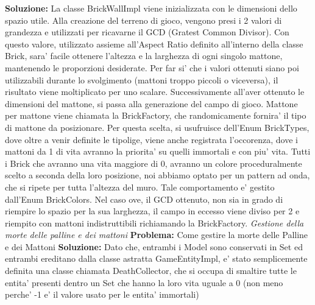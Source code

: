 \documentclass[a4paper,12pt]{report}
\begin{document}
\newline
\textbf{Soluzione:} La classe BrickWallImpl viene inizializzata con le dimensioni dello spazio utile.\newline
Alla creazione del terreno di gioco, vengono presi i 2 valori di grandezza e utilizzati per ricavarne il GCD (Gratest Common Divisor). Con questo valore, utilizzato assieme all'Aspect Ratio definito all'interno della classe Brick, sara' facile ottenere l'altezza e la larghezza di ogni singolo mattone, mantenendo le proporzioni desiderate.
Per far si' che i valori ottenuti siano poi utilizzabili durante lo svolgimento (mattoni troppo piccoli o viceversa), il risultato viene moltiplicato per uno scalare.\newline
Successivamente all'aver ottenuto le dimensioni del mattone, si passa alla generazione del campo di gioco. Mattone per mattone viene chiamata la BrickFactory, che randomicamente fornira' il tipo di mattone da posizionare. Per questa scelta, si usufruisce dell'Enum BrickTypes, dove oltre a venir  definite le tipolige, viene anche registrata l'occorenza, dove i mattoni da 1 di vita avranno la priorita' su quelli immortali e con piu' vita. \newline
Tutti i Brick che avranno una vita maggiore di 0, avranno un colore proceduralmente scelto a seconda della loro posizione, noi abbiamo optato per un pattern ad onda, che si ripete per tutta l'altezza del muro. Tale comportamento e' gestito dall'Enum BrickColors.\newline
Nel caso ove, il GCD ottenuto, non sia in grado di riempire lo spazio per la sua larghezza, il campo in eccesso viene diviso per 2 e riempito con mattoni indistruttibili richiamando la BrickFactory.\newline
\newline
\textit{Gestione della morte delle palline e dei mattoni}
\newline
\newline
\textbf{Problema:} Come gestire la morte delle Palline e dei Mattoni
\newline
\newline
\textbf{Soluzione:} Dato che, entrambi i Model sono conservati in Set ed entrambi ereditano dalla classe astratta GameEntityImpl, e' stato semplicemente definita una classe chiamata DeathCollector, che si occupa di smaltire tutte le entita' presenti dentro un Set che hanno la loro vita uguale a 0 (non meno perche' -1 e' il valore usato per le entita' immortali)
\newline
\newline
\end{document}
